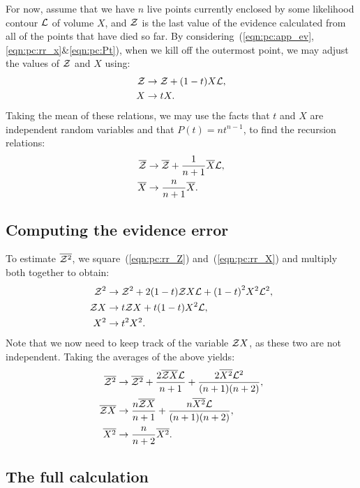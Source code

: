 For now, assume that we have $n$ live points currently enclosed by some likelihood contour $\mathcal{L}$ of volume $X$, and $\mathcal{Z}$ is the last value of the evidence calculated from all of the points that have died so far. By considering~(\ref{eqn:pc:app_ev},\ref{eqn:pc:rr_x}\&\ref{eqn:pc:Pt}), when we kill off the outermost point, we may adjust the values of $\mathcal{Z}$ and $X$ using:
%
\begin{align}                                                         
\mathcal{Z} &\to \mathcal{Z} + (1-t)X\mathcal{L},
\label{eqn:pc:rr_Z}
\\
X &\to tX.
\label{eqn:pc:rr_X}
\end{align}
%
Taking the mean of these relations, we may use the facts that $t$ and $X$ are independent random variables and that $P(t) = n t^{n-1}$, to find the recursion relations:
\begin{align}
  \overline{\mathcal{Z}} &\to \overline{\mathcal{Z}} + \frac{1}{n+1}\overline{X}\mathcal{L},
  \label{eqn:pc:rr_Zb}
  \\
  \overline{X} &\to \frac{n}{n+1}\overline{X}.
  \label{eqn:pc:rr_Xb}
\end{align}
%

\subsection{Computing the evidence error}
\label{sec:pc:basic_error}
To estimate $\overline{\mathcal{Z}^2}$, we square~(\ref{eqn:pc:rr_Z}) and~(\ref{eqn:pc:rr_X}) and multiply both together to obtain:
%
\begin{align}
  \mathcal{Z}^2 &\to \mathcal{Z}^2 + 2(1-t)\mathcal{Z} X\mathcal{L} +  {(1-t)}^2X^2\mathcal{L} ^2,
  \label{eqn:pc:rr_Z2b}
  \\
  \mathcal{Z} X &\to t\mathcal{Z} X + t(1-t)X^2\mathcal{L},
  \label{eqn:pc:rr_ZXb}
  \\
  X^2 &\to t^2X^2.
  \label{eqn:pc:rr_X2b}
\end{align}
%
Note that we now need to keep track of the variable $\mathcal{Z} X$, as these two are not independent.
Taking the averages of the above yields:
\begin{align}
  \overline{\mathcal{Z}^2} &\to \overline{\mathcal{Z}^2} + \frac{2\overline{\mathcal{Z} X}\mathcal{L}}{n+1} +  \frac{2\overline{X^2}\mathcal{L}^2}{(n+1)(n+2)},
  \\
  \overline{\mathcal{Z} X} &\to \frac{n\overline{\mathcal{Z} X}}{n+1} + \frac{n\overline{X^2}\mathcal{L}}{(n+1)(n+2)},
  \\
  \overline{X^2} &\to \frac{n}{n+2}\overline{X^2}.
\end{align}

\subsection{The full calculation}
\label{sec:pc:basic_full}

